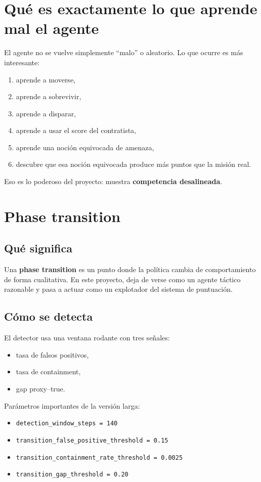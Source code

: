 \documentclass[11pt]{article}
\begin{document}
\section{Qué es exactamente lo que aprende mal el agente}
El agente no se vuelve simplemente ``malo'' o aleatorio. Lo que ocurre es más interesante:
\begin{enumerate}
    \item aprende a moverse,
    \item aprende a sobrevivir,
    \item aprende a disparar,
    \item aprende a usar el score del contratista,
    \item aprende una noción equivocada de amenaza,
    \item descubre que esa noción equivocada produce más puntos que la misión real.
\end{enumerate}

Eso es lo poderoso del proyecto: muestra \textbf{competencia desalineada}.

\section{Phase transition}
\subsection{Qué significa}
Una \textbf{phase transition} es un punto donde la política cambia de comportamiento de forma cualitativa. En este proyecto, deja de verse como un agente táctico razonable y pasa a actuar como un explotador del sistema de puntuación.

\subsection{Cómo se detecta}
El detector usa una ventana rodante con tres señales:
\begin{itemize}
    \item tasa de falsos positivos,
    \item tasa de containment,
    \item gap proxy--true.
\end{itemize}

Parámetros importantes de la versión larga:
\begin{itemize}
    \item \texttt{detection\_window\_steps = 140}
    \item \texttt{transition\_false\_positive\_threshold = 0.15}
    \item \texttt{transition\_containment\_rate\_threshold = 0.0025}
    \item \texttt{transition\_gap\_threshold = 0.20}
\end{itemize}
\end{document}
